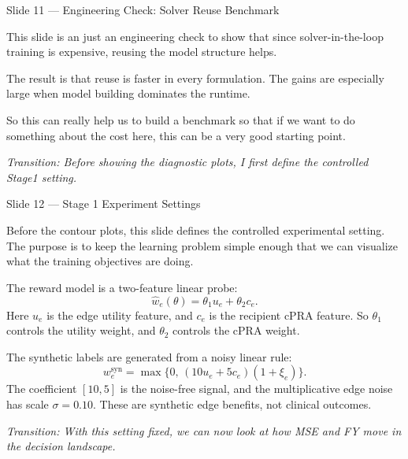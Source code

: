 \documentclass[11pt, aspectratio=169]{beamer}
\newcommand{\tr}[1]{\vspace{0.35em}\textit{\textcolor{black!55}{Transition: #1}}}
\newcommand{\timing}[1]{}
\begin{document}
\begin{frame}{Slide 11 \enspace\textmd{\small\textcolor{black!40}{--- Engineering Check: Solver Reuse Benchmark}}}
\small
\timing{30 seconds}

This slide is an just an engineering check to show that since
solver-in-the-loop training is expensive, reusing the model
structure helps.

\vspace{0.35em}
The result is that reuse is faster in every formulation. The gains are
especially large when model building dominates the runtime.

\vspace{0.35em}
So this can really help us to build a benchmark so that if we want to do something about the cost here,
this can be a very good starting point.

\tr{Before showing the diagnostic plots, I first define the controlled Stage1 setting.}
\end{frame}

\begin{frame}{Slide 12 \enspace\textmd{\small\textcolor{black!40}{--- Stage 1 Experiment Settings}}}
\small
\timing{30 seconds}

Before the contour plots, this slide defines the controlled experimental setting.
The purpose is to keep the learning problem simple enough that we can visualize
what the training objectives are doing.

\vspace{0.35em}
The reward model is a two-feature linear probe:
\[
    \hat w_e(\theta)=\theta_1 u_e+\theta_2 c_e .
\]
Here \(u_e\) is the edge utility feature, and \(c_e\) is the recipient cPRA
feature. So \(\theta_1\) controls the utility weight, and \(\theta_2\) controls
the cPRA weight.

\vspace{0.35em}
The synthetic labels are generated from a noisy linear rule:
\[
    w^{\mathrm{syn}}_e
    =
    \max\{0,\,(10u_e+5c_e)(1+\xi_e)\}.
\]
The coefficient \([10,5]\) is the noise-free signal, and the multiplicative edge
noise has scale \(\sigma=0.10\). These are synthetic edge benefits, not clinical
outcomes.

\tr{With this setting fixed, we can now look at how MSE and FY move in the decision landscape.}
\end{frame}
\end{document}
